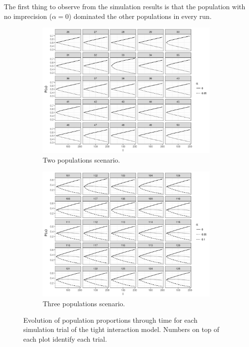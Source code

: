 \documentclass[a4paper]{article}
\begin{document}
The first thing to observe from the simulation results is that the population with no imprecision ($\alpha = 0$) dominated the other populations in every run.
\begin{figure}
  \centering
  \begin{subfigure}[]{.9\textwidth}
    \includegraphics[width=\textwidth]{simulation/results/round-3/plots/proportion-cases-0-005-strong-square.png}
    \caption{Two populations scenario.}
    \label{fig:proportion-cases-two-tight-interaction}
  \end{subfigure}
  \hfill
  \begin{subfigure}[]{.9\textwidth}
    \includegraphics[width=\textwidth]{simulation/results/round-3/plots/proportion-cases-0-005-01-strong-square.png}
    \caption{Three populations scenario.}
    \label{fig:proportion-cases-three-tight-interaction}
  \end{subfigure}
  \caption{Evolution of population proportions through time for each simulation trial of the tight interaction model. Numbers on top of each plot identify each trial.}
  \label{fig:proportion-cases-tight-interaction}
\end{figure}
\end{document}
